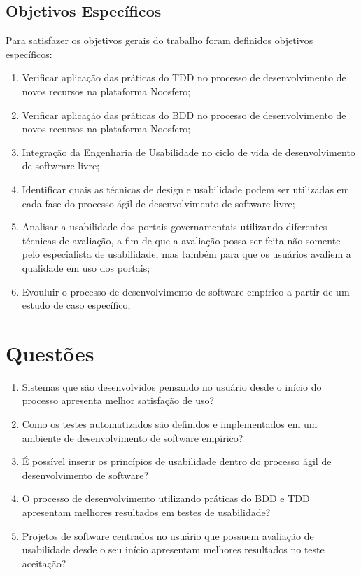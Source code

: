 	 
	 
	\subsection{Objetivos Específicos}

	 Para satisfazer os objetivos gerais do trabalho foram definidos objetivos específicos:

	\begin{enumerate}
	\item Verificar aplicação das práticas do TDD no processo de desenvolvimento de novos recursos na plataforma Noosfero;
	\item Verificar aplicação das práticas do BDD no processo de desenvolvimento de novos recursos na plataforma Noosfero;
	\item Integração da Engenharia de Usabilidade no ciclo de vida de desenvolvimento de softwrare livre;
	\item Identificar quais as técnicas de design e usabilidade  podem ser utilizadas em cada fase do processo ágil de desenvolvimento de software livre;
	\item Analisar a usabilidade dos portais governamentais utilizando diferentes técnicas de avaliação, a fim de que a avaliação possa ser feita não somente pelo especialista de usabilidade, mas também para que os usuários avaliem a qualidade em uso dos portais;
	\item Evouluir o processo de desenvolvimento de software empírico a partir de um estudo de caso específico;
	\end{enumerate}

	\section{Questões}
	\begin{enumerate}
	\item Sistemas que são desenvolvidos pensando no usuário desde o início do processo apresenta melhor  satisfação de uso?
	\item Como os testes automatizados são definidos e implementados em um ambiente de desenvolvimento de software empírico?
	\item É possível inserir os princípios de usabilidade dentro do processo ágil de desenvolvimento de software?
	\item O processo de desenvolvimento utilizando práticas do BDD e TDD apresentam melhores resultados em testes de usabilidade?
	\item Projetos de software centrados no usuário que possuem avaliação de usabilidade desde o seu início apresentam melhores resultados no teste aceitação?
	\end{enumerate}
	 
